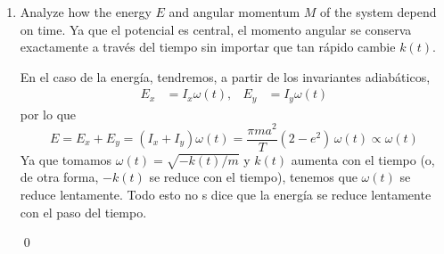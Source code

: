 \documentclass[]{article}
\numberwithin{equation}{section}
\begin{document}
\begin{enumerate}
	\item[b.] Analyze how the energy $E$ and angular momentum $M$ of the system depend on time.
	\resp Ya que el potencial es central, el momento angular se conserva exactamente a través del tiempo sin importar que tan rápido cambie $k(t)$.
	
	En el caso de la energía, tendremos, a partir de los invariantes adiabáticos,
	\begin{align}
		E_x &= I_x \omega(t), & E_y &= I_y \omega(t)
	\end{align}
	por lo que
	\begin{equation}
		E = E_x + E_y = \left(I_x + I_y\right) \omega(t) = \frac{\pi m a^2}{T} (2 - e^2) \, \omega(t) \propto \omega(t)
	\end{equation}
	Ya que tomamos $\omega(t) = \sqrt{- k(t)/m}$ y $k(t)$ aumenta con el tiempo (o, de otra forma, $-k(t)$ se reduce con el tiempo), tenemos que $\omega(t)$ se reduce lentamente. Todo esto no s dice que la energía se reduce lentamente con el paso del tiempo.
	
	\qed
	
\end{enumerate}
\end{document}
